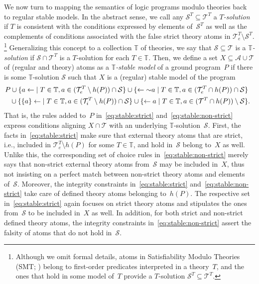 \documentclass[a4paper,USenglish]{oasics-v2016}
\newcommand{\naf}[1]{\ensuremath{{\sim}{#1}}}
\newcommand{\head}[1]{\ensuremath{h(#1)}}
\newcommand{\neghspace}{\!\!\!\!\!}
\begin{document}
We now turn to mapping the semantics of logic programs modulo theories back to regular stable models.
%
In the abstract sense, we call any $\mathcal{S}^T\subseteq\mathcal{T}^T$ a \emph{$T$-solution}
if $T$ is consistent with the conditions expressed by elements of~$\mathcal{S}^T$ as well as the complements of
conditions associated with the false strict theory atoms in $\mathcal{T}^T_e\setminus \mathcal{S}^T$.%
\footnote{%
  Although we omit formal details, atoms in
  Satisfiability Modulo Theories (SMT; \cite{baseseti09a})
  belong to first-order predicates interpreted in a theory~$T$,
  and the ones that hold in some model of~$T$ provide a $T$-solution $\mathcal{S}^T\subseteq\mathcal{T}^T$.}
Generalizing this concept to a collection $\mathbb{T}$ of theories,
we say that $\mathcal{S}\subseteq\mathcal{T}$ is a \emph{$\mathbb{T}$-solution} if
$\mathcal{S}\cap\mathcal{T}^T$ is a $T$-solution for each $T\in\mathbb{T}$.
Then, we define a set $X\subseteq\mathcal{A}\cup\mathcal{T}$ of (regular and theory) atoms
as a \emph{$\mathbb{T}$-stable model} of a ground program~$P$ if
%
there is some $\mathbb{T}$-solution $\mathcal{S}$ such that
$X$ is a (regular) stable model of the program
%
\begin{align}%
%
\neghspace
P
%
\cup
\{{a\leftarrow}       \mid T\in\mathbb{T},a\in (\mathcal{T}^T_e\setminus\head{P})\cap \mathcal{S}\}
\cup
\{ {\leftarrow\naf{a}}\mid T\in\mathbb{T},a\in (\mathcal{T}^T_e\cap\head{P})\cap \mathcal{S}\}
\label{eq:stable:strict}
\\
\neghspace
%
{}\cup
\{{\{a\}\leftarrow}   \mid T\in\mathbb{T},a\in (\mathcal{T}^T_i\setminus\head{P})\cap \mathcal{S}\}
\cup
\{ {\leftarrow{a}}    \mid T\in\mathbb{T},a\in (\mathcal{T}^T\cap\head{P})\setminus \mathcal{S}\}\rlap{.}
\label{eq:stable:non-strict}
\end{align}
%
%
%
That is, the rules added to~$P$ in~\eqref{eq:stable:strict} and~\eqref{eq:stable:non-strict}
express conditions aligning $X\cap\mathcal{T}$ with an underlying $\mathbb{T}$-solution~$\mathcal{S}$.
First, the facts in~\eqref{eq:stable:strict} make sure that external theory atoms
that are strict, i.e., included in $\mathcal{T}^T_e\setminus\head{P}$ for some $T\in\mathbb{T}$,
and hold in~$\mathcal{S}$ belong to~$X$ as well.
Unlike this, the corresponding set of choice rules in~\eqref{eq:stable:non-strict}
merely says that non-strict external theory atoms from~$\mathcal{S}$ may be included in~$X$,
thus not insisting on a perfect match between non-strict theory atoms and elements of~$\mathcal{S}$.
Moreover, the integrity constraints in~\eqref{eq:stable:strict} and~\eqref{eq:stable:non-strict}
take care of defined theory atoms belonging to~$\head{P}$.
The respective set in~\eqref{eq:stable:strict} again focuses on strict theory atoms and
stipulates the ones from~$\mathcal{S}$ to be included in~$X$ as well.
In addition, for both strict and non-strict defined theory atoms,
the integrity constraints in~\eqref{eq:stable:non-strict} assert the falsity
of atoms that do not hold in~$\mathcal{S}$.
\end{document}
